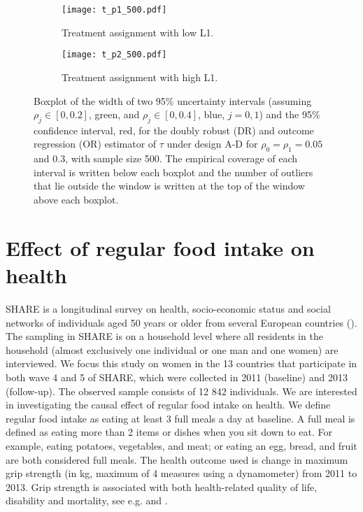 \documentclass[11pt]{article}
\begin{document}
\begin{figure} [htbp]
\centering
\begin{subfigure}[b]{\textwidth}
\texttt{[image: t\_p1\_500.pdf]}
\caption{Treatment assignment with low L1.}
\label{t.p1.500.fig}
\end{subfigure}
\begin{subfigure}[b]{\textwidth}
\texttt{[image: t\_p2\_500.pdf]}
\caption{Treatment assignment with high L1.}
\label{t.p2.500.fig}
\end{subfigure}
\caption{Boxplot of the width of two 95\% uncertainty intervals (assuming $\rho_j \in [0,0.2]$, green, and $\rho_j \in [0,0.4]$, blue, $j=0,1$) and the 95\% confidence interval, red, for the doubly robust (DR) and outcome regression (OR) estimator of $\tau$ under design A-D for $\rho_0=\rho_1=0.05$ and $0.3$, with sample size 500. The empirical coverage of each interval is written below each boxplot and the number of outliers that lie outside the window is written at the top of the window above each boxplot.}
\label{t.500.fig}
\end{figure}


\section{Effect of regular food intake on health}
SHARE is a longitudinal survey on health, socio-economic status and social networks of individuals aged 50 years or older from several European countries (\citealp{SHARE}). The sampling in SHARE is on a household level where all residents in the household (almost exclusively one individual or one man and one women) are interviewed. We focus this study on women in the 13 countries that participate in both wave 4 and 5 of SHARE, which were collected in 2011 (baseline) and 2013 (follow-up). The observed sample consists of 12 842 individuals. We are interested in investigating the causal effect of regular food intake on health. We define regular food intake as eating at least 3 full meals a day at baseline. A full meal is defined as eating more than 2 items or dishes when you sit down to eat. For example, eating potatoes, vegetables, and meat; or eating an egg, bread, and fruit are both considered full meals.  The health outcome used is change in maximum grip strength (in kg, maximum of 4 measures using a dynamometer) from 2011 to 2013. Grip strength is associated with both health-related quality of life, disability and mortality, see e.g. \cite{GS:Health} and \cite{GS:Death}. 
\end{document}
